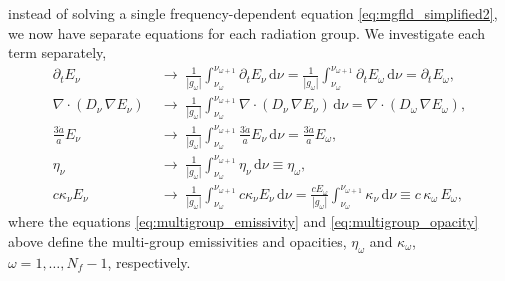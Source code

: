 \documentclass[10pt]{article}
\renewcommand{\(}{\left(}
\renewcommand{\)}{\right)}
\newcommand{\adot}{\dot{a}}
\newcommand{\Enu}{E_{\nu}}
\begin{document}
instead of solving a single frequency-dependent equation
\eqref{eq:mgfld_simplified2}, we now have separate equations for each
radiation group. We investigate each term separately,
\begin{align}
 \label{eq:multigroup_timederivative}
   \partial_{t} \Enu &\;\rightarrow\;
   \frac{1}{|g_{\omega}|} \int_{\nu_{\omega}}^{\nu_{\omega+1}} \partial_{t} \Enu\,\mathrm d\nu
   =
   \frac{1}{|g_{\omega}|} \int_{\nu_{\omega}}^{\nu_{\omega+1}} \partial_{t} E_{\omega}\,\mathrm d\nu
   =
   \partial_{t} E_{\omega}, \\
 \label{eq:multigroup_diffusion}
   \nabla\cdot(D_{\nu}\,\nabla\Enu) &\;\rightarrow\;
   \frac{1}{|g_{\omega}|} \int_{\nu_{\omega}}^{\nu_{\omega+1}} \nabla\cdot(D_{\nu}\,\nabla\Enu)\,\mathrm d\nu
   =
   \nabla\cdot(D_{\omega}\,\nabla E_{\omega}), \\
 \label{eq:multigroup_depletion}
   \frac{3 \adot}{a} \Enu &\;\rightarrow\;
   \frac{1}{|g_{\omega}|} \int_{\nu_{\omega}}^{\nu_{\omega+1}} \frac{3 \adot}{a} \Enu\,\mathrm d\nu
   =
   \frac{3 \adot}{a} E_{\omega}, \\
 \label{eq:multigroup_emissivity}
   \eta_{\nu} &\;\rightarrow\;
   \frac{1}{|g_{\omega}|} \int_{\nu_{\omega}}^{\nu_{\omega+1}} \eta_{\nu}\,\mathrm d\nu
   \equiv
   \eta_{\omega}, \\
 \label{eq:multigroup_opacity}
   c \kappa_{\nu} \Enu &\;\rightarrow\;
   \frac{1}{|g_{\omega}|} \int_{\nu_{\omega}}^{\nu_{\omega+1}} c \kappa_{\nu} \Enu\,\mathrm d\nu
   =
   \frac{c E_{\omega}}{|g_{\omega}|} \int_{\nu_{\omega}}^{\nu_{\omega+1}} \kappa_{\nu}\,\mathrm d\nu
   \equiv
   c\, \kappa_{\omega}\, E_{\omega},
\end{align}
where the equations \eqref{eq:multigroup_emissivity} and
\eqref{eq:multigroup_opacity} above define the multi-group emissivities
and opacities, $\eta_{\omega}$ and $\kappa_{\omega}$,
$\omega=1,\ldots,N_f-1$, respectively.
\end{document}
